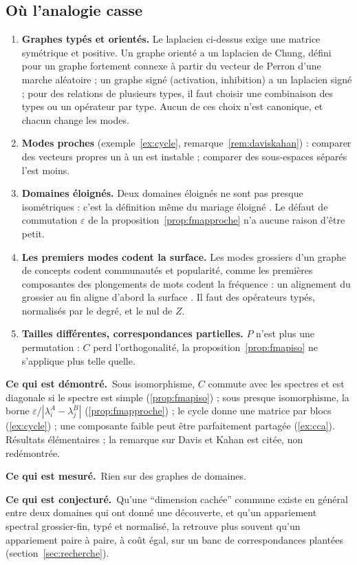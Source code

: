 \documentclass[11pt,a4paper]{article}
\theoremstyle{definition}
\theoremstyle{plain}
\newcommand{\demontre}{\par\noindent\textbf{Ce qui est démontré.}~}
\newcommand{\mesure}{\par\smallskip\noindent\textbf{Ce qui est mesuré.}~}
\newcommand{\conjecture}{\par\smallskip\noindent\textbf{Ce qui est conjecturé.}~}
\begin{document}
\subsection{Où l'analogie casse}
\begin{enumerate}
\item \textbf{Graphes typés et orientés.} Le laplacien ci-dessus exige une matrice symétrique et
positive. Un graphe orienté a un laplacien de Chung, défini pour un graphe fortement connexe à
partir du vecteur de Perron d'une marche aléatoire \cite{chung2005} ; un graphe signé (activation,
inhibition) a un laplacien signé \cite{kunegis2010} ; pour des relations de plusieurs types, il
faut choisir une combinaison des types ou un opérateur par type. Aucun de ces choix n'est canonique,
et chacun change les modes.
\item \textbf{Modes proches} (exemple~\ref{ex:cycle}, remarque~\ref{rem:daviskahan}) : comparer des
vecteurs propres un à un est instable ; comparer des sous-espaces séparés l'est moins.
\item \textbf{Domaines éloignés.} Deux domaines éloignés ne sont pas presque isométriques : c'est la
définition même du mariage éloigné \cite[section~7]{q5}. Le défaut de commutation $\varepsilon$ de la
proposition~\ref{prop:fmapproche} n'a aucune raison d'être petit.
\item \textbf{Les premiers modes codent la surface.} Les modes grossiers d'un graphe de concepts
codent communautés et popularité, comme les premières composantes des plongements de mots codent
la fréquence \cite[p.~4]{mu2018} : un alignement du grossier au fin aligne d'abord la surface
\cite[section~7]{q5}. Il faut des opérateurs typés, normalisés par le degré, et le nul de $Z$.
\item \textbf{Tailles différentes, correspondances partielles.} $P$ n'est plus une permutation :
$C$ perd l'orthogonalité, la proposition~\ref{prop:fmapiso} ne s'applique plus telle quelle.
\end{enumerate}

\begin{statuts}
\demontre Sous isomorphisme, $C$ commute avec les spectres et est diagonale si le spectre est simple
(\ref{prop:fmapiso}) ; sous presque isomorphisme, la borne $\varepsilon/|\lambda^A_i-\lambda^B_j|$
(\ref{prop:fmapproche}) ; le cycle donne une matrice par blocs (\ref{ex:cycle}) ; une composante
faible peut être parfaitement partagée (\ref{ex:cca}). Résultats élémentaires ; la remarque sur
Davis et Kahan est citée, non redémontrée.
\mesure Rien sur des graphes de domaines.
\conjecture Qu'une \enquote{dimension cachée} commune existe en général entre deux domaines qui ont
donné une découverte, et qu'un appariement spectral grossier-fin, typé et normalisé, la retrouve
plus souvent qu'un appariement paire à paire, à coût égal, sur un banc de correspondances plantées
(section~\ref{sec:recherche}).
\end{statuts}
\end{document}
